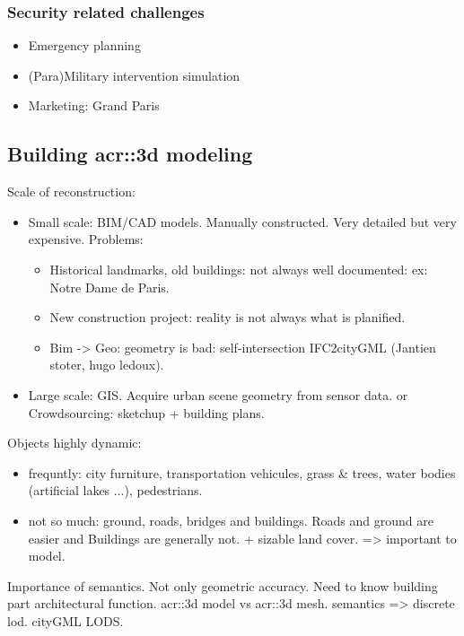         \subsubsection{Security related challenges}
        \begin{itemize}
            \item Emergency planning
            \item (Para)Military intervention simulation
            \item Marketing: Grand Paris
        \end{itemize}
    \subsection{Building \gls{acr::3d} modeling}
        \label{subsec::introduction::urban_3d_reconstruction::building_3d_modeling}
        Scale of reconstruction:
        \begin{itemize}
            \item Small scale: BIM/CAD models. Manually constructed. Very detailed but very expensive. Problems:
            \begin{itemize}
                \item Historical landmarks, old buildings: not always well documented: ex: Notre Dame de Paris.
                \item New construction project: reality is not always what is planified.
                \item Bim -> Geo: geometry is bad: self-intersection IFC2cityGML (Jantien stoter, hugo ledoux).
            \end{itemize}
            \item Large scale: GIS. Acquire urban scene geometry from sensor data. or Crowdsourcing: sketchup + building plans.
        \end{itemize}
        Objects highly dynamic:
        \begin{itemize}
            \item frequntly: city furniture, transportation vehicules, grass \& trees, water bodies (artificial lakes ...), pedestrians.
            \item not so much: ground, roads, bridges and buildings. Roads and ground are easier and Buildings are generally not. + sizable land cover. => important to model.\\
        \end{itemize}
        Importance of semantics. Not only geometric accuracy. Need to know building part architectural function. \gls{acr::3d} model vs \gls{acr::3d} mesh.
        semantics => discrete lod. cityGML LODS.\\
